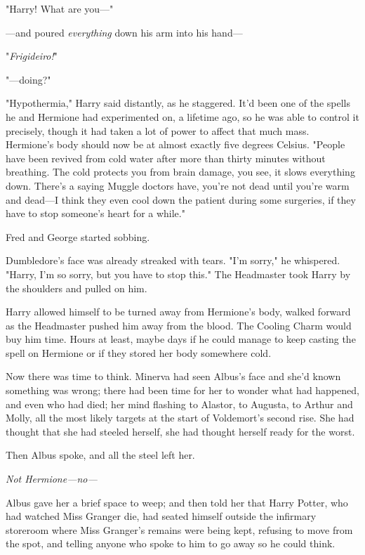 "Harry! What are you---"

---and poured \emph{everything} down his arm into his hand---

"\emph{Frigideiro!}"

"---doing?"

"Hypothermia," Harry said distantly, as he staggered. It'd been one of the 
spells he and Hermione had experimented on, a lifetime ago, so he was able to 
control it precisely, though it had taken a lot of power to affect that much 
mass. Hermione's body should now be at almost exactly five degrees Celsius. 
"People have been revived from cold water after more than thirty minutes 
without breathing. The cold protects you from brain damage, you see, it slows 
everything down. There's a saying Muggle doctors have, you're not dead until 
you're warm and dead---I think they even cool down the patient during some 
surgeries, if they have to stop someone's heart for a while."

Fred and George started sobbing.

Dumbledore's face was already streaked with tears. "I'm sorry," he whispered. 
"Harry, I'm so sorry, but you have to stop this." The Headmaster took Harry by 
the shoulders and pulled on him.

Harry allowed himself to be turned away from Hermione's body, walked forward as 
the Headmaster pushed him away from the blood. The Cooling Charm would buy him 
time. Hours at least, maybe days if he could manage to keep casting the spell 
on Hermione or if they stored her body somewhere cold.

Now there was time to think.
\sbreak
Minerva had seen Albus's face and she'd known something was wrong; there had 
been time for her to wonder what had happened, and even who had died; her mind 
flashing to Alastor, to Augusta, to Arthur and Molly, all the most likely 
targets at the start of Voldemort's second rise. She had thought that she had 
steeled herself, she had thought herself ready for the worst.

Then Albus spoke, and all the steel left her.

\emph{Not Hermione---no---}

Albus gave her a brief space to weep; and then told her that Harry Potter, who 
had watched Miss Granger die, had seated himself outside the infirmary 
storeroom where Miss Granger's remains were being kept, refusing to move from 
the spot, and telling anyone who spoke to him to go away so he could think.

